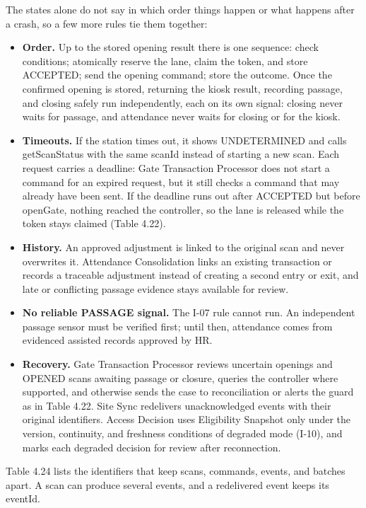 The states alone do not say in which order things happen or what happens after a crash, so a few more rules tie them together:

\begin{itemize}[leftmargin=36pt, itemsep=2pt, topsep=4pt, parsep=2pt]
  \item \textbf{Order.} Up to the stored opening result there is one sequence: check conditions; atomically reserve the lane, claim the token, and store ACCEPTED; send the opening command; store the outcome. Once the confirmed opening is stored, returning the kiosk result, recording passage, and closing safely run independently, each on its own signal: closing never waits for passage, and attendance never waits for closing or for the kiosk.
  \item \textbf{Timeouts.} If the station times out, it shows UNDETERMINED and calls getScanStatus with the same scanId instead of starting a new scan. Each request carries a deadline: Gate Transaction Processor does not start a command for an expired request, but it still checks a command that may already have been sent. If the deadline runs out after ACCEPTED but before openGate, nothing reached the controller, so the lane is released while the token stays claimed (Table 4.22).
  \item \textbf{History.} An approved adjustment is linked to the original scan and never overwrites it. Attendance Consolidation links an existing transaction or records a traceable adjustment instead of creating a second entry or exit, and late or conflicting passage evidence stays available for review.
  \item \textbf{No reliable PASSAGE signal.} The I-07 rule cannot run. An independent passage sensor must be verified first; until then, attendance comes from evidenced assisted records approved by HR.
  \item \textbf{Recovery.} Gate Transaction Processor reviews uncertain openings and OPENED scans awaiting passage or closure, queries the controller where supported, and otherwise sends the case to reconciliation or alerts the guard as in Table 4.22. Site Sync redelivers unacknowledged events with their original identifiers. Access Decision uses Eligibility Snapshot only under the version, continuity, and freshness conditions of degraded mode (I-10), and marks each degraded decision for review after reconnection.
\end{itemize}

Table 4.24 lists the identifiers that keep scans, commands, events, and batches apart. A scan can produce several events, and a redelivered event keeps its eventId.


